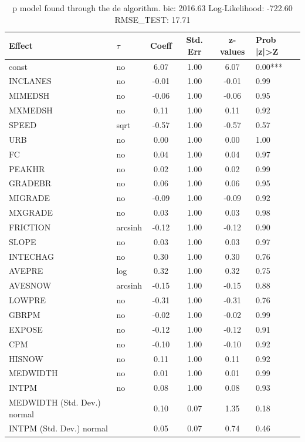 \begin{table}
	\caption{p model found through the de algorithm. bic: 2016.63 Log-Likelihood: -722.60 RMSE_TEST: 17.71}
	\begin{center}
		\begin{tabular}{|l|l|c|c|c|l|}
			\hline
			Effect & $\tau$ & Coeff & Std. Err & z-values & Prob |z|>Z \\
			\hline
			const & no & 6.07 & 1.00 & 6.07 & 0.00*** \\
			\hline
			INCLANES & no & -0.01 & 1.00 & -0.01 & 0.99 \\
			\hline
			MIMEDSH & no & -0.06 & 1.00 & -0.06 & 0.95 \\
			\hline
			MXMEDSH & no & 0.11 & 1.00 & 0.11 & 0.92 \\
			\hline
			SPEED & sqrt & -0.57 & 1.00 & -0.57 & 0.57 \\
			\hline
			URB & no & 0.00 & 1.00 & 0.00 & 1.00 \\
			\hline
			FC & no & 0.04 & 1.00 & 0.04 & 0.97 \\
			\hline
			PEAKHR & no & 0.02 & 1.00 & 0.02 & 0.99 \\
			\hline
			GRADEBR & no & 0.06 & 1.00 & 0.06 & 0.95 \\
			\hline
			MIGRADE & no & -0.09 & 1.00 & -0.09 & 0.92 \\
			\hline
			MXGRADE & no & 0.03 & 1.00 & 0.03 & 0.98 \\
			\hline
			FRICTION & arcsinh & -0.12 & 1.00 & -0.12 & 0.90 \\
			\hline
			SLOPE & no & 0.03 & 1.00 & 0.03 & 0.97 \\
			\hline
			INTECHAG & no & 0.30 & 1.00 & 0.30 & 0.76 \\
			\hline
			AVEPRE & log & 0.32 & 1.00 & 0.32 & 0.75 \\
			\hline
			AVESNOW & arcsinh & -0.15 & 1.00 & -0.15 & 0.88 \\
			\hline
			LOWPRE & no & -0.31 & 1.00 & -0.31 & 0.76 \\
			\hline
			GBRPM & no & -0.02 & 1.00 & -0.02 & 0.99 \\
			\hline
			EXPOSE & no & -0.12 & 1.00 & -0.12 & 0.91 \\
			\hline
			CPM & no & -0.10 & 1.00 & -0.10 & 0.92 \\
			\hline
			HISNOW & no & 0.11 & 1.00 & 0.11 & 0.92 \\
			\hline
			MEDWIDTH & no & 0.01 & 1.00 & 0.01 & 0.99 \\
			\hline
			INTPM & no & 0.08 & 1.00 & 0.08 & 0.93 \\
			\hline
			MEDWIDTH (Std. Dev.) normal &  & 0.10 & 0.07 & 1.35 & 0.18 \\
			\hline
			INTPM (Std. Dev.) normal &  & 0.05 & 0.07 & 0.74 & 0.46 \\
			\hline
		\end{tabular}
	\end{center}
\end{table}